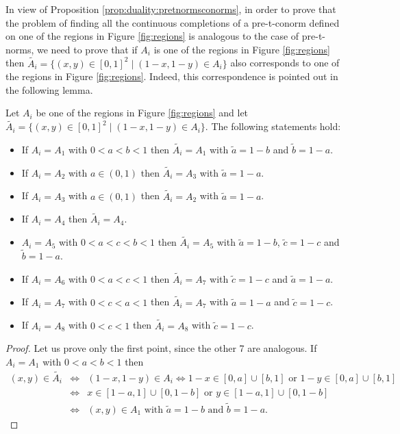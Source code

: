 In view of Proposition \ref{prop:duality:pretnormsconorms}, in order to prove that the problem of finding all the continuous completions of a pre-t-conorm defined on one of the regions in Figure \ref{fig:regions} is analogous to the case of pre-t-norms, we need to prove that if $A_i$ is one of the regions in Figure \ref{fig:regions} then $\tilde{A_i} = \{(x,y) \in [0,1]^2 \mid (1-x,1-y) \in A_i\}$ also corresponds to one of the regions in Figure \ref{fig:regions}. Indeed, this correspondence is pointed out in the following lemma.

\begin{lemma}\label{lemma:dualregions}
	Let $A_i$ be one of the regions in Figure \ref{fig:regions} and let $\tilde{A_i} = \{(x,y) \in [0,1]^2 \mid (1-x,1-y) \in A_i\}$. The following statements hold:
	\begin{itemize}
		\item If $A_i=A_1$ with $0<a<b<1$ then $\tilde{A_i}=A_1$ with $\tilde{a}=1-b$ and $\tilde{b}=1-a$.
		\item If $A_i=A_2$ with $a \in (0,1)$ then $\tilde{A_i}=A_3$ with $\tilde{a}=1-a$.
		\item If $A_i=A_3$ with $a \in (0,1)$ then $\tilde{A_i}=A_2$ with $\tilde{a}=1-a$.
		\item If $A_i=A_4$ then $\tilde{A_i}=A_4$.
		\item $A_i=A_5$ with $0<a<c<b<1$ then $\tilde{A_i}=A_5$ with $\tilde{a}=1-b$, $\tilde{c}=1-c$ and $\tilde{b}=1-a$.
		\item If $A_i=A_6$ with $0<a<c<1$ then $\tilde{A_i}=A_7$ with $\tilde{c}=1-c$ and $\tilde{a}=1-a$.
		\item If $A_i=A_7$ with $0<c<a<1$ then $\tilde{A_i}=A_7$ with $\tilde{a}=1-a$ and $\tilde{c}=1-c$.
		\item If $A_i=A_8$ with $0<c<1$ then $\tilde{A_i}=A_8$ with $\tilde{c}=1-c$.
	\end{itemize}
\end{lemma}
\begin{proof}
	Let us prove only the first point, since the other 7 are analogous. If $A_i=A_1$ with $0<a<b<1$ then
	\begin{eqnarray*}
	(x,y) \in \tilde{A_i} &\Leftrightarrow&(1-x,1-y) \in A_i \Leftrightarrow 1-x \in [0,a] \cup [b,1] \text{ or } 1-y \in [0,a] \cup [b,1] \\
	& \Leftrightarrow & x \in [1-a,1] \cup [0,1-b] \text{ or } y \in [1-a,1] \cup [0,1-b]\\
		& \Leftrightarrow & (x,y) \in A_1 \text{ with } \tilde{a}=1-b \text{ and } \tilde{b}=1-a.
	\end{eqnarray*} 
\end{proof}

